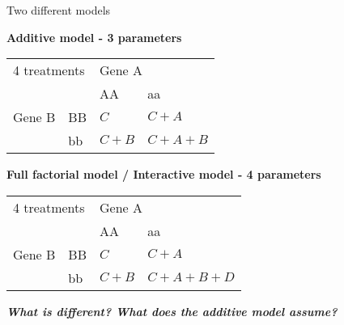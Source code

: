 \documentclass{beamer}
\begin{document}
\begin{frame}{Two different models}

\textbf{Additive model - 3 parameters}
\begin{center}
\begin{tabular}{|l | l | l | l | }
\toprule
  \multicolumn{2}{|l|}{4 treatments} & \multicolumn{2}{l|}{Gene A}\\
  \cmidrule(lr){3-4}
  \multicolumn{2}{|l|}{}  & AA & aa\\
 	    \midrule
      Gene B & BB & $C$ & $C+A$\\
      \cmidrule(lr){3-4}
 	    & bb & $C+B$ & $C+A+B$\\
	    \bottomrule
  \end{tabular}
\end{center}
 

\textbf{Full factorial model / Interactive model  - 4 parameters }
\begin{center}
\begin{tabular}{|l | l | l | l | }
\toprule
  \multicolumn{2}{|l|}{4 treatments} & \multicolumn{2}{l|}{Gene A}\\
  \cmidrule(lr){3-4}
  \multicolumn{2}{|l|}{}  & AA & aa\\
 	    \midrule
      Gene B & BB & $C$ & $C+A$\\
      \cmidrule(lr){3-4}
 	    & bb & $C+B$ & $C+A+B+D$\\
	    \bottomrule
  \end{tabular}
\end{center}
 

 \textbf{\emph{What is different? What does the additive model assume?}}
\end{frame}
\end{document}
